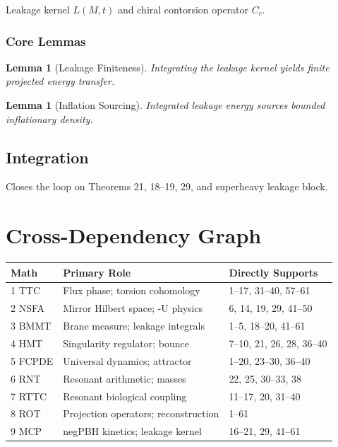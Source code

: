 \documentclass[11pt,a4paper]{book}
\newtheorem{lemma}[theorem]{Lemma}
\theoremstyle{remark}
\theoremstyle{definition}
\begin{document}
Leakage kernel \(L(M,t)\) and chiral contorsion operator \(C_c\).

\subsection{Core Lemmas}

\begin{lemma}[Leakage Finiteness]
Integrating the leakage kernel yields finite projected energy transfer.
\end{lemma}

\begin{lemma}[Inflation Sourcing]
Integrated leakage energy sources bounded inflationary density.
\end{lemma}

\section{Integration}

Closes the loop on Theorems 21, 18–19, 29, and superheavy leakage block.

\chapter{Cross-Dependency Graph}

\begin{center}
\begin{tabular}{@{}lll@{}}
\toprule
\textbf{Math} & \textbf{Primary Role} & \textbf{Directly Supports} \\
\midrule
1 TTC & Flux phase; torsion cohomology & 1–17, 31–40, 57–61 \\
2 NSFA & Mirror Hilbert space; -U physics & 6, 14, 19, 29, 41–50 \\
3 BMMT & Brane measure; leakage integrals & 1–5, 18–20, 41–61 \\
4 HMT & Singularity regulator; bounce & 7–10, 21, 26, 28, 36–40 \\
5 FCPDE & Universal dynamics; attractor & 1–20, 23–30, 36–40 \\
6 RNT & Resonant arithmetic; masses & 22, 25, 30–33, 38 \\
7 RTTC & Resonant biological coupling & 11–17, 20, 31–40 \\
8 ROT & Projection operators; reconstruction & 1–61 \\
9 MCP & negPBH kinetics; leakage kernel & 16–21, 29, 41–61 \\
\bottomrule
\end{tabular}
\end{center}
\end{document}
